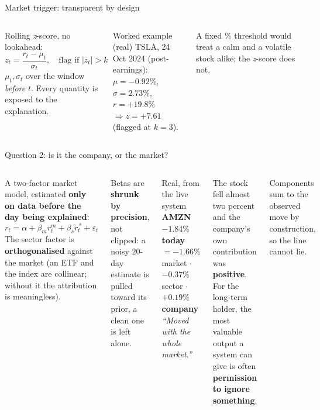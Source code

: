 \documentclass[aspectratio=169]{beamer}
\begin{document}
\begin{frame}{Market trigger: transparent by design}
\begin{columns}
Rolling \emph{z}-score, no lookahead:
\[ z_t=\frac{r_t-\mu_t}{\sigma_t},\quad \text{flag if } |z_t|>k \]
$\mu_t,\sigma_t$ over the window \emph{before} $t$. Every quantity is exposed to the explanation.
\begin{block}{Worked example (real)}
\small TSLA, 24 Oct 2024 (post-earnings):\\
$\mu=-0.92\%$, $\sigma=2.73\%$, $r=+19.8\%$\\
$\Rightarrow z=\mathbf{+7.61}$ (flagged at $k=3$).
\end{block}
A fixed \% threshold would treat a calm and a volatile stock alike; the \emph{z}-score does not.
\end{columns}
\end{frame}

\begin{frame}{Question 2: is it the company, or the market?}
\begin{columns}
\small
A two-factor market model, estimated \textbf{only on data before the day being explained}:
\[ r_t = \alpha + \beta_m r^{m}_t + \beta_s \tilde r^{\,s}_t + \varepsilon_t \]
The sector factor is \textbf{orthogonalised} against the market (an ETF and the index are
collinear; without it the attribution is meaningless).
\medskip

Betas are \textbf{shrunk by precision}, not clipped: a noisy 20-day estimate is pulled toward its
prior, a clean one is left alone.
\begin{block}{Real, from the live system}
\small
\textbf{AMZN $-1.84\%$ today} \\[2pt]
$= -1.66\%$ market $\cdot$ $-0.37\%$ sector $\cdot$ $\mathbf{+0.19\%}$ \textbf{company} \\[3pt]
\emph{``Moved with the whole market.''}
\end{block}
{\small The stock fell almost two percent and the company's own contribution was
\textbf{positive}. For the long-term holder, the most valuable output a system can give is often
\textbf{permission to ignore something}.}
\medskip

{\footnotesize Components sum to the observed move by construction, so the line cannot lie.}
\end{columns}
\end{frame}
\end{document}
